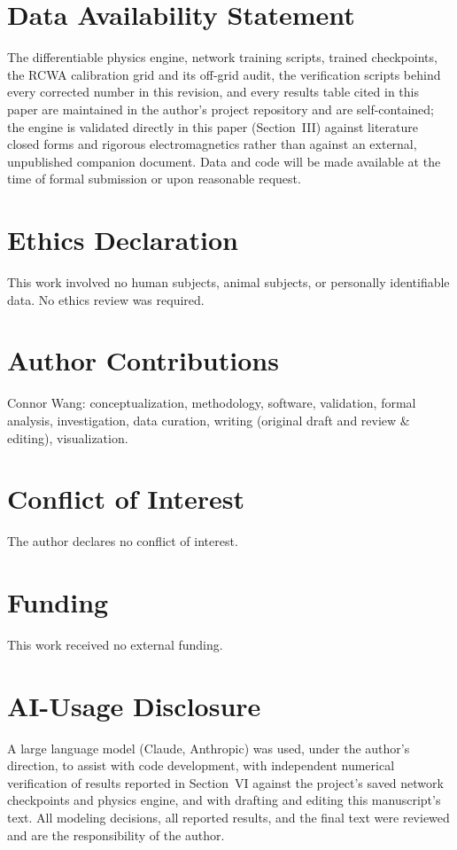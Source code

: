 \documentclass[10pt,twocolumn]{article}
\begin{document}
\section*{Data Availability Statement}
The differentiable physics engine, network training scripts, trained
checkpoints, the RCWA calibration grid and its off-grid audit, the
verification scripts behind every corrected number in this revision, and
every results table cited in this paper are maintained in the author's
project repository and are self-contained; the engine is validated
directly in this paper (Section~III) against literature closed forms and
rigorous electromagnetics rather than against an external, unpublished
companion document. Data and code will be made available at the time of
formal submission or upon reasonable request.

\section*{Ethics Declaration}
This work involved no human subjects, animal subjects, or personally
identifiable data. No ethics review was required.

\section*{Author Contributions}
Connor Wang: conceptualization, methodology, software, validation, formal
analysis, investigation, data curation, writing (original draft and
review \& editing), visualization.

\section*{Conflict of Interest}
The author declares no conflict of interest.

\section*{Funding}
This work received no external funding.

\section*{AI-Usage Disclosure}
A large language model (Claude, Anthropic) was used, under the author's
direction, to assist with code development, with independent numerical
verification of results reported in Section~VI against the project's
saved network checkpoints and physics engine, and with drafting and
editing this manuscript's text. All modeling decisions, all reported
results, and the final text were reviewed and are the responsibility of
the author.
\end{document}
